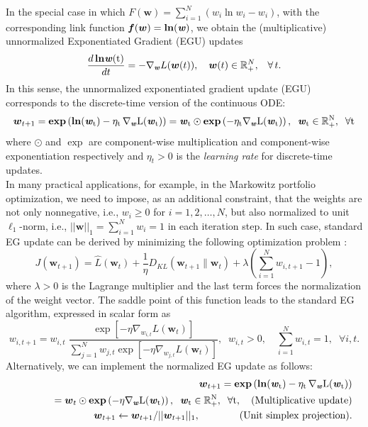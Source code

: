 \documentclass[10pt]{amsart}
\newcommand{\beq}{\begin{equation}}
\newcommand{\eeq}{\end{equation}}
\newcommand{\bea}{\begin{eqnarray}}
\newcommand{\eea}{\end{eqnarray}}
\newcommand{\bi}[1]{\textbf{\textit{#1}}}
\newcommand{\bln}{\rm{\bf{ln}}}
\newcommand{\bexp}{\rm{\bf{exp}}}
\newcommand{\bof}{\boldsymbol{f}}
\newcommand{\Rp}{\mathbb{R}^{N}_{+}}
\newcommand{\bw}{\boldsymbol{w}}
\theoremstyle{definition}
\theoremstyle{definition}	 %
\begin{document}
In the special case in which $ F(\bw) = \sum_{i=1}^N (w_i \ln w_i - w_i)$, with the corresponding  link function $\bof(\bw) = \bln (\bi w)$,  we obtain the (multiplicative) unnormalized Exponentiated Gradient (EGU) updates  \cite{EG} %
%
\beq
		\frac{d\,\bln \bi w(t)}{d t}= -  \nabla_{\bi w} L(\bw(t)), \quad \bw(t) \in \Rp, \;\;\; \forall \, t .
		\label{MDEG1}
	\eeq
%
In this sense, the unnormalized exponentiated gradient  update  (EGU) corresponds to the discrete-time version of the continuous ODE:
%
\beq
	\bw_{t+1}
	= \bexp \left( \bln (\bi w_t) - \eta_t\, \nabla_{\bi w} L(\bi w_t) \right) \nonumber
	= \bi w_t \odot \bexp \left( - \eta_t \nabla_{\bi w} L(\bi w_t) \right), \;\; \bi w_t \in \Rp, \;\; \forall t
\label{EGU}
\eeq
where   $\odot$  and $\exp$ are component-wise multiplication and component-wise exponentiation respectively and $\eta_t  >0$ is the \textit{learning rate} for discrete-time updates.\\


In many practical applications, for example, in the Markowitz portfolio optimization, we  need to impose, as an additional constraint, that the weights are not only nonnegative, i.e.,  $w_i \geq 0$ for $i=1,2,\ldots,N$, but also normalized to unit $\ell_1$-norm, i.e.,  $||\bw||_1=\sum_{i=1}^{N} w_i =1$ in each iteration step. In such case,  standard EG update can be derived by minimizing the following optimization problem \cite{EG,KW1995,Helmbold98}:
\beq
	J(\bw_{t+1}) =  \hat{L}(\bw_{t})  + \frac{1}{\eta} D_{KL}(\bw_{t+1} \| \bw_{t}) + \lambda \left(\sum_{i=1}^{N} w_{i,t+1}-1\right),
\eeq
where $\lambda >0$ is the Lagrange multiplier and the last term forces the normalization of the weight vector. The saddle point of this function leads to the standard EG algorithm, expressed in scalar form as \cite{EG,Helmbold98}
\beq \label{eq:38}
w_{i,t+1} = w_{i,t} \; \frac{\exp [- \eta \nabla_{w_{i,t}} L(\bw_{t})]}{\sum_{j=1}^N w_{j,t} \exp [- \eta \nabla_{w_{j,t}} L(\bw_{t})]}, \;\; w_{i,t}>0, \quad \sum_{i=1}^{N}w_{i,t} =1, \;\; \forall i,t.
\eeq
Alternatively, we can implement the normalized EG update as follows:
\bea \label{EG}
&& \bw_{t+1}  =  \bexp \left( \bln (\bi w_t) - \eta_t\, \nabla_{\bi w} L(\bi w_t) \right)  \\
 && \hspace{10mm}	= \bw_t \odot \bexp \left( - \eta \nabla_{\bi w} L(\bi w_t) \right), \;\; \bi w_t \in \mathbb{R}^{N}_{+}, \;\; \forall t, \quad \text{(Multiplicative update)} \nonumber \\
&& \bw_{t+1}  \leftarrow 	\bw_{t+1} / ||\bw_{t+1}||_1, \qquad \qquad \text{(Unit simplex projection)}.
\eea
\end{document}
